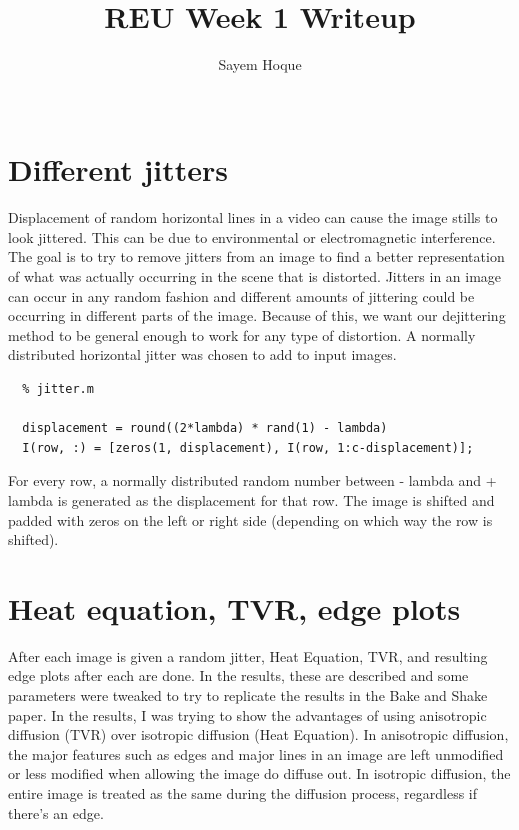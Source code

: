 \documentclass[12pt]{article}
\begin{document}
\title{REU Week 1 Writeup}

\author{Sayem Hoque\\
 \\ }

\maketitle
\date{}

\section{Different jitters}
Displacement of random horizontal lines in a video can cause the image stills to look jittered. This can be due to environmental or electromagnetic interference. The goal is to try to remove jitters from an image to find a better representation of what was actually occurring in the scene that is distorted. Jitters in an image can occur in any random fashion and different amounts of jittering could be occurring in different parts of the image. Because of this, we want our dejittering method to be general enough to work for any type of distortion. A normally distributed horizontal jitter was chosen to add to input images.
\begin{verbatim}
  % jitter.m

  displacement = round((2*lambda) * rand(1) - lambda)
  I(row, :) = [zeros(1, displacement), I(row, 1:c-displacement)];
\end{verbatim}
For every row, a normally distributed random number between - lambda and + lambda is generated as the displacement for that row. The image is shifted and padded with zeros on the left or right side (depending on which way the row is shifted).

\section{Heat equation, TVR, edge plots}

After each image is given a random jitter, Heat Equation, TVR, and resulting edge plots after each are done. In the results, these are described and some parameters were tweaked to try to replicate the results in the Bake and Shake paper. In the results, I was trying to show the advantages of using anisotropic diffusion (TVR) over isotropic diffusion (Heat Equation). In anisotropic diffusion, the major features such as edges and major lines in an image are left unmodified or less modified when allowing the image do diffuse out. In isotropic diffusion, the entire image is treated as the same during the diffusion process, regardless if there's an edge. \\
\end{document}
